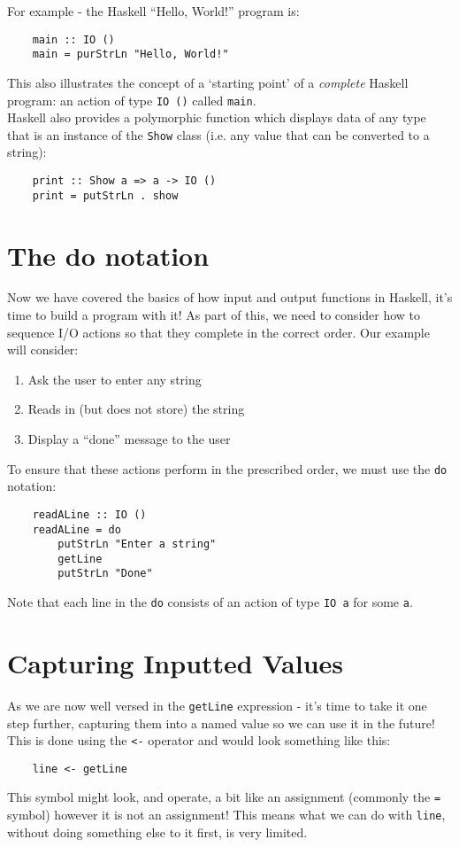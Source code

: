 For example - the Haskell ``Hello, World!'' program is:
\begin{verbatim}
    main :: IO ()
    main = purStrLn "Hello, World!"
\end{verbatim}

This also illustrates the concept of a `starting point' of a \textit{complete} Haskell program: an action of type \verb|IO ()| called \verb|main|.\\

Haskell also provides a polymorphic function which displays data of any type that is an instance of the \verb|Show| class (i.e. any value that can be converted to a string):
\begin{verbatim}
    print :: Show a => a -> IO ()
    print = putStrLn . show
\end{verbatim}

\section{The do notation}
Now we have covered the basics of how input and output functions in Haskell, it's time to build a program with it! As part of this, we need to consider how to sequence I/O actions so that they complete in the correct order. Our example will consider:
\begin{enumerate}
    \item Ask the user to enter any string
    \item Reads in (but does not store) the string
    \item Display a ``done'' message to the user
\end{enumerate}
To ensure that these actions perform in the prescribed order, we must use the \verb|do| notation:
\begin{verbatim}
    readALine :: IO ()
    readALine = do
        putStrLn "Enter a string"
        getLine
        putStrLn "Done"
\end{verbatim}
Note that each line in the \verb|do| consists of an action of type \verb|IO a| for some \verb|a|. 

\section{Capturing Inputted Values}
As we are now well versed in the \verb|getLine| expression - it's time to take it one step further, capturing them into a named value so we can use it in the future! This is done using the \verb|<-| operator and would look something like this:
\begin{verbatim}
    line <- getLine
\end{verbatim}
This symbol might look, and operate, a bit like an assignment (commonly the \verb|=| symbol) however it is not an assignment! This means what we can do with \verb|line|, without doing something else to it first, is very limited. 

